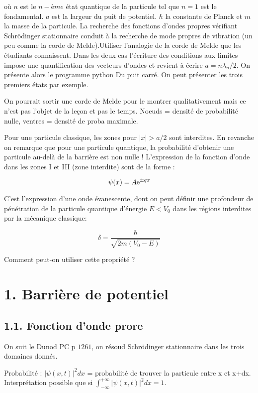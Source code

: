 \documentclass[french, a4paper, 10pt, twocolumn, landscape]{article}
\begin{document}
où $n$ est le $n-ème$ état quantique de la particule tel que $n=1$ est le fondamental. $a$ est la largeur du puit de potentiel. $\hbar$ la constante de Planck et $m$ la masse de la particule. La recherche des fonctions d'ondes propres vérifiant Schrödinger stationnaire conduit à la recherche de mode propres de vibration (un peu comme la corde de Melde).Utiliser l'analogie de la corde de Melde que les étudiants connaissent.  Dans les deux cas l'écriture des conditions aux limites impose une quantification des vecteurs d'ondes  et revient à écrire $a=n\lambda_n/2$.  On présente alors le programme python Du puit carré. On peut présenter les trois premiers états par exemple.\medskip

On pourrait sortir une corde de Melde pour le montrer qualitativement mais ce n'est pas l'objet de la leçon et pas le temps. Noeuds = densité de probabilité nulle, ventres = densité de proba maximale.

Pour une particule classique, les zones pour $|x|>a/2$ sont interdites. En revanche on remarque que pour une particule quantique, la probabilité d'obtenir une particule au-delà de la barrière est non nulle ! L'expression de la fonction d'onde dans les zones I et III (zone interdite) sont de la forme :

\begin{equation}
    \psi(x) = A{\rm e}^{\pm qx}
\end{equation}

C'est l'expression d'une onde évanescente, dont on peut définir une profondeur de pénétration de la particule quantique d'énergie $E<V_0$ dans les régions interdites par la mécanique classique:

\begin{equation}
    \delta = \dfrac{\hbar}{\sqrt{2m(V_0-E)}}
\end{equation}

Comment peut-on utiliser cette propriété ? 

\section*{1. Barrière de potentiel}

\subsection*{1.1. Fonction d'onde prore}
On suit le Dunod PC p $1261$, on résoud Schrödinger stationnaire dans les trois domaines donnés.


Probabilité : $|\psi(x,t)|^2dx$ = probabilité de trouver la particule entre x et x+dx. Interprétation possible que si $\int_{-\infty}^{+\infty}|\psi(x,t)|^2dx=1$.\\
\end{document}

